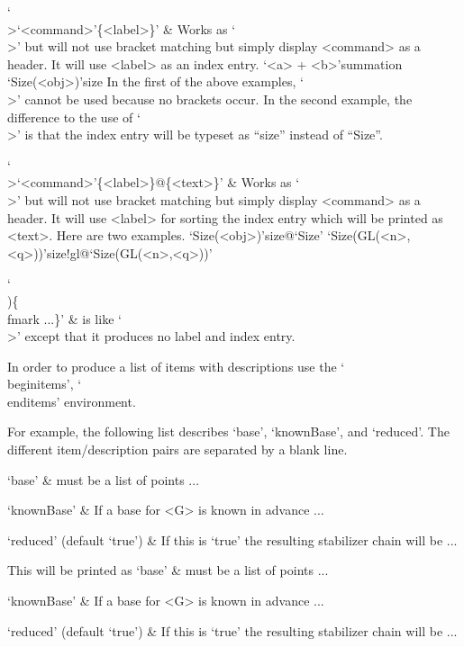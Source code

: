 `\\>{`<command>'}\{<label>\}' &
    Works as `\\>' but will not use bracket matching but simply display
    <command> as a header.
    It will use <label> as an index entry.
\begintt
\>`<a> + <b>'{summation}
\>`Size(<obj>)'{size}
\endtt
    In the first of the above examples, `\\>' cannot be used because
    no brackets occur.
    In the second example, the difference to the use of `\\>' is
    that the index entry will be typeset as ``size'' instead of ``Size''.

`\\>{`<command>'}\{<label>\}@\{<text>\}' &
    Works as `\\>' but will not use bracket matching but simply display
    <command> as a header.
    It will use <label> for sorting the index entry which will be printed
    as <text>.
    Here are two examples.
\begintt
\>`Size(<obj>)'{size}@{`Size'}
\>`Size(GL(<n>,<q>))'{size!gl}@{`Size(GL(<n>,<q>))'}
\endtt

`\\)\{\\fmark ...\}' &
    is like `\\>' except that it produces no label and index entry.
\enditems


In order  to   produce  a  list   of  items with   descriptions  use  the
`\\beginitems', `\\enditems' environment.

For example, the   following  list describes   `base', `knownBase',  and
`reduced'.  The different item/description pairs are separated by a blank
line.

\begintt
\beginitems
`base' &
    must be a  list of points ...

`knownBase' &
    If a base for <G> is known in advance ...

`reduced' (default `true') &
    If this is `true' the resulting stabilizer chain will be ...
\enditems
\endtt

This will be printed as
\beginitems
`base' &
    must be a  list of points ...

`knownBase' &
    If a base for <G> is known in advance ...

`reduced' (default `true') &
    If this is `true' the resulting stabilizer chain will be ...
\enditems

